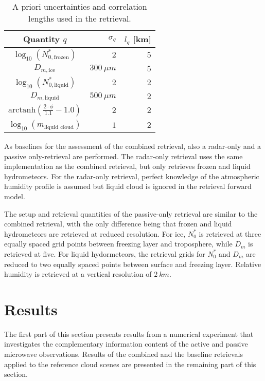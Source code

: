 \documentclass[journal abbreviation, manuscript]{copernicus}
\begin{document}
\begin{table}[h!]
\caption{A priori uncertainties and correlation
 lengths used in the retrieval.}
 \centering
\label{tab:a_priori}
    \begin{tabular}{c|r|r}
     Quantity $q$ & $\sigma_q$ & $l_q$ [km]\\
    \hline
    $\log_{10}(N_{0, \text{frozen}}^*)$    & $2$                       & $5$ \\
    $D_{m, \text{ice}}$               & $300\ \unit{\mu m}$          & $5$ \\
    $\log_{10}(N_{0, \text{liquid}}^*)$    & $2                      $ & $2$ \\
    $D_{m, \text{liquid}}$            & $500\ \unit{\mu m}$           & $2$ \\
    $\text{arctanh}(\frac{2 \cdot \phi}{1.1} - 1.0)$ & $2$       & $2$ \\
    $\log_{10}(m_\text{liquid cloud}) $ & $1$                       & $2$ \\
    \end{tabular}
\end{table}

As baselines for the assessment of the combined retrieval, also a radar-only and
a passive only-retrieval are performed. The radar-only retrieval uses the same
implementation as the combined retrieval, but only retrieves frozen and liquid
hydrometeors. For the radar-only retrieval, perfect knowledge of the atmospheric
humidity profile is assumed but liquid cloud is ignored in the retrieval forward
model.

The setup and retrieval quantities of the passive-only retrieval are similar to
the combined retrieval, with the only difference being that frozen and liquid
hydrometeors are retrieved at reduced resolution. For ice, $N_0^*$ is retrieved
at three equally spaced grid points between freezing layer and troposphere, while
$D_m$ is retrieved at five. For liquid hydormeteors, the retrieval grids for
$N_0^*$ and $D_m$ are reduced to two equally spaced points between surface and
freezing layer. Relative humidity is retrieved at a vertical resolution of
$2\ \unit{km}$.

\section{Results}
\label{sec:results}

The first part of this section presents results from a numerical experiment 
that investigates the complementary information content of the active and passive
microwave observations. Results of the combined  and the baseline retrievals applied
to the reference cloud scenes are presented in the remaining part of this section.
\end{document}
